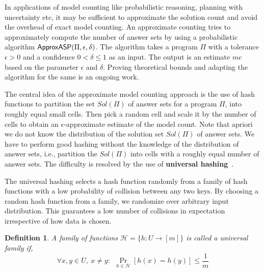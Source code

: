 \documentclass{article}
\newtheorem{definition}{Definition}
\newcommand{\fff}{\ensuremath{\Pi}\xspace}
\newcommand{\mc}{$mc$\xspace}
\newcommand{\ep}{$\epsilon$\xspace}
\newcommand{\del}{$\delta$\xspace}
\def\appasp{\normalfont \textsf{ApproxASP}\xspace}
\newcommand{\sol}{$Sol(\Pi)$\xspace}
\begin{document}
In applications of model counting like probabilistic reasoning, planning with uncertainty etc, it may be sufficient to approximate the solution count and avoid the overhead of exact model counting.
%
An approximate counting tries to approximately compute the number of answer sets by using a probabilistic algorithm $\appasp(\fff, \epsilon, \delta)$.
%
The algorithm takes a program $\fff$ with a tolerance $\epsilon > 0$ and a confidence $0 < \delta \leq 1$ as an input.
%
The output is an estimate \mc based on the parameter \ep and \del.
%
Proving theoretical bounds and adapting the algorithm for the same is an ongoing work.

The central idea of the approximate model counting approach is the use of hash functions to partition the set \sol of answer sets for a program $\fff$, into roughly equal small cells.
%
Then pick a random cell and scale it by the number of cells to obtain an \ep-approximate estimate of the model count.
%
Note that apriori we do not know the distribution of the solution set \sol of answer sets.
%
We have to perform good hashing without the knowledge of the distribution of answer sets, i.e., partition the $Sol(\Pi)$ into cells with a roughly equal number of answer sets.
%
%
%
The difficulty is resolved by the use of \textbf{universal hashing}~\cite{DBLP:conf/stoc/CarterW77}.

The universal hashing selects a hash function randomly from a family of hash functions with a low probability of collision between any two keys. 
%
By choosing a random hash function from a family, we randomize over arbitrary input distribution. This guarantees a low number of collisions in expectation irrespective of how data is chosen.

\begin{definition}
A family of functions $\mathcal{H}=\{h: U \to [m]\}$  is called a universal family if,
\[ \forall x,y\in U,~x\neq y:~~\Pr _{h\in \mathcal{H}}[h(x)=h(y)]\leq {\frac {1}{m}} \]
\end{definition}
\end{document}
